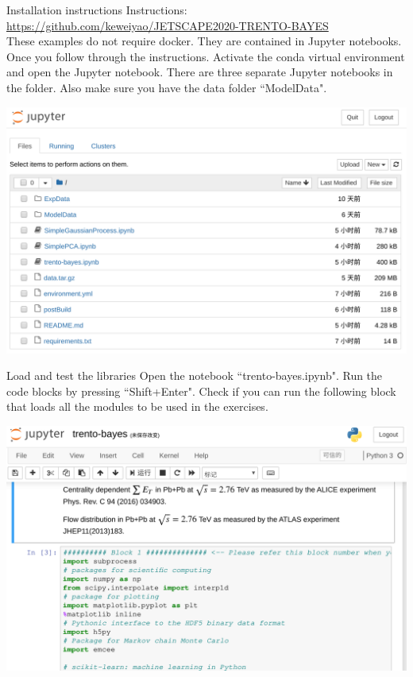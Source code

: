 \documentclass[11pt,aspect ratio=1610]{beamer}
\begin{document}


\begin{frame}{Installation instructions}
Instructions: \url{https://github.com/keweiyao/JETSCAPE2020-TRENTO-BAYES}\\
These examples do not require docker. They are contained in Jupyter notebooks. \\
\vspace{1em}
Once you follow through the instructions. Activate the conda virtual environment and open the Jupyter notebook. There are three separate Jupyter notebooks in the folder. Also make sure you have the data folder ``ModelData".
\begin{center}
\includegraphics[width=.6\textwidth]{figs/Notebook-1.png}
\end{center}
\end{frame}

\begin{frame}{Load and test the libraries}
Open the notebook ``trento-bayes.ipynb". Run the code blocks by pressing ``Shift+Enter". Check if you can run the following block that loads all the modules to be used in the exercises.

\begin{center}
\includegraphics[width=.7\textwidth]{figs/load.png}
\end{center}
\end{frame}
\end{document}
